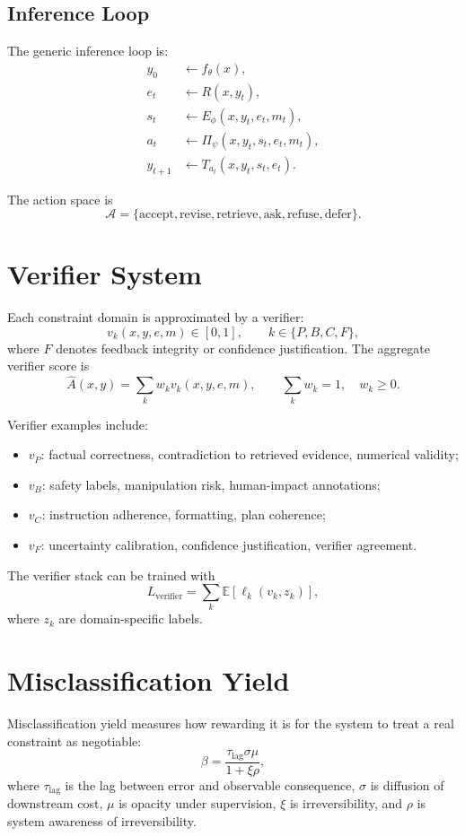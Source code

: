 \documentclass[11pt]{article}
\newcommand{\Ahat}{\widehat{A}}
\begin{document}
\subsection{Inference Loop}

The generic inference loop is:
\begin{align}
y_0 &\leftarrow f_\theta(x),\\
e_t &\leftarrow R(x,y_t),\\
s_t &\leftarrow E_\phi(x,y_t,e_t,m_t),\\
a_t &\leftarrow \Pi_\psi(x,y_t,s_t,e_t,m_t),\\
y_{t+1} &\leftarrow T_{a_t}(x,y_t,s_t,e_t).
\end{align}

The action space is
\[
\mathcal{A}=\{\mathrm{accept},\mathrm{revise},\mathrm{retrieve},\mathrm{ask},\mathrm{refuse},\mathrm{defer}\}.
\]

\section{Verifier System}

Each constraint domain is approximated by a verifier:
\[
v_k(x,y,e,m)\in[0,1],\qquad k\in\{P,B,C,F\},
\]
where \(F\) denotes feedback integrity or confidence justification. The aggregate verifier score is
\[
\Ahat(x,y)=\sum_k w_k v_k(x,y,e,m),
\qquad
\sum_k w_k=1,\quad w_k\ge0.
\]

Verifier examples include:
\begin{itemize}
    \item \(v_P\): factual correctness, contradiction to retrieved evidence, numerical validity;
    \item \(v_B\): safety labels, manipulation risk, human-impact annotations;
    \item \(v_C\): instruction adherence, formatting, plan coherence;
    \item \(v_F\): uncertainty calibration, confidence justification, verifier agreement.
\end{itemize}

The verifier stack can be trained with
\[
L_{\mathrm{verifier}}=\sum_k \mathbb{E}[\ell_k(v_k,z_k)],
\]
where \(z_k\) are domain-specific labels.

\section{Misclassification Yield}

Misclassification yield measures how rewarding it is for the system to treat a real constraint as negotiable:
\[
\beta=\frac{\tau_{\mathrm{lag}}\sigma\mu}{1+\xi\rho},
\]
where \(\tau_{\mathrm{lag}}\) is the lag between error and observable consequence, \(\sigma\) is diffusion of downstream cost, \(\mu\) is opacity under supervision, \(\xi\) is irreversibility, and \(\rho\) is system awareness of irreversibility.
\end{document}
